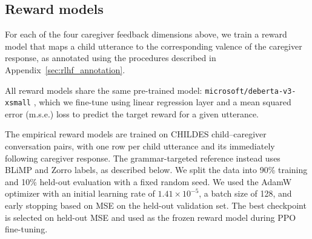 \subsection*{Reward models}

For each of the four caregiver feedback dimensions above, we train a reward model that maps a child utterance to the corresponding valence of the caregiver response, as annotated using the procedures described in Appendix~\ref{sec:rlhf_annotation}.



All reward models share the same pre-trained model:
\texttt{microsoft/deberta-v3-xsmall} \citep{he_debertav3_2022}, which we fine-tune using linear regression layer and a mean squared error (m.s.e.) loss to predict the target reward for a given utterance.

The empirical reward models are trained on CHILDES child--caregiver conversation pairs, with one row per child utterance and its immediately following caregiver response. The grammar-targeted reference instead uses BLiMP and Zorro labels, as described below.
We split the data into 90\% training and 10\% held-out evaluation with a fixed random seed.  
We used the AdamW optimizer with an initial learning rate of $1.41 \times 10^{-5}$, a batch size of 128, and early stopping based on MSE on the held-out validation set.
The best checkpoint is selected on held-out MSE and used as the frozen reward model during PPO fine-tuning.

